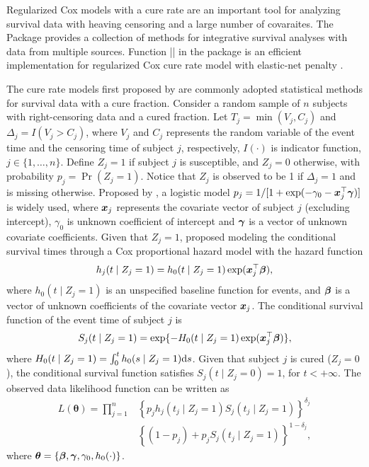 Regularized Cox models with a cure rate are an important tool for
analyzing survival data with heaving censoring and a large number of
covaraites. The  Package 
\citep{intsurv-package} provides a collection of methods for integrative
survival analyses with data from multiple sources. Function
\VERB|\NormalTok{()}| in the package is
an efficient implementation for regularized Cox cure rate model with
elastic-net penalty \citep{zouHastie2005jrssb}.

The cure rate models first proposed by \citet{berkson1952jasa} are
commonly adopted statistical methods for survival data with a cure
fraction. Consider a random sample of \(n\) subjects with
right-censoring data and a cured fraction. Let \(T_j=\min(V_j, C_j)\)
and \(\Delta_j=I(V_j > C_j)\), where \(V_j\) and \(C_j\) represents the
random variable of the event time and the censoring time of subject
\(j\), respectively, \(I(\cdot)\) is indicator function,
\(j\in\{1,\ldots,n\}\). Define \(Z_j = 1\) if subject \(j\) is
susceptible, and \(Z_j = 0\) otherwise, with probability
\(p_j = \Pr(Z_j = 1)\). Notice that \(Z_j\) is observed to be 1 if
\(\Delta_j=1\) and is missing otherwise. Proposed by
\citet{farewell1982biometrics}, a logistic model
\(p_j=1/[1+\exp(-\gamma_0-\bm{x}^{\top}_j\bm{\gamma})]\) is widely used, where
\(\bm{x}_j\) represents the covariate vector of subject \(j\) (excluding
intercept), \(\gamma_0\) is unknown coefficient of intercept and \(\bm{\gamma}\)
is a vector of unknown covariate coefficients. Given that \(Z_j = 1\),
\citet{kuk1992biometrika} proposed modeling the conditional survival
times through a Cox proportional hazard model with the hazard function
\[h_j(t\mid Z_j = 1) = h_0(t\mid Z_j = 1) \exp(\bm{x}_j^{\top}\bm{\beta}),\] where
\(h_0(t\mid Z_j = 1)\) is an unspecified baseline function for events,
and \(\bm{\beta}\) is a vector of unknown coefficients of the covariate vector
\(\bm{x}_j\). The conditional survival function of the event time of
subject \(j\) is
\[S_j(t\mid Z_j = 1) = \exp\{-H_0(t\mid Z_j = 1) \exp(\bm{x}_j^{\top} \bm{\beta}) \},\]
where \(H_0(t\mid Z_j = 1) = \int_0^t h_0(s\mid Z_j = 1) \mathrm{d} s\). Given
that subject \(j\) is cured (\(Z_j = 0\)), the conditional survival
function satisfies \(S_j(t\mid Z_j=0) = 1\), for \(t<+\infty\). The
observed data likelihood function can be written as
\begin{align}\label{eqn:mod}
L(\bm{\theta}) = \prod_{j=1}^n
& \left\{ p_j h_j(t_j\mid Z_j=1) S_j(t_j\mid Z_j=1) \right\}^{\delta_j}\nonumber\\
& \left\{(1 - p_j) + p_j S_j(t_j \mid Z_j = 1)\right\}^{1-\delta_j},
\end{align} where \(\bm{\theta}=\{\bm{\beta},\bm{\gamma},\gamma_0,h_0(\cdot)\}\).

